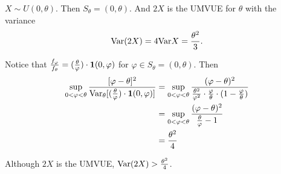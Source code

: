 \begin{exap}
	$X \sim U(0,\theta)$. Then $S_\theta = (0,\theta)$. And $2X$ is the UMVUE for $\theta$ with the variance
	$$\mathrm{Var} (2X) = 4 \mathrm{Var} X = \frac{\theta^2}{3}.$$
	 
	Notice that $\frac{f_\varphi}{f_\theta} = (\frac{\theta}{\varphi}) \cdot \boldsymbol{1}(0, \varphi)$ for $\varphi \in S_\theta = (0,\theta)$. Then
	\begin{align*}
		\sup_{0 < \varphi < \theta} \frac{ [\varphi - \theta]^2 }{ \mathrm{Var}_{\theta} [ (\frac{\theta}{\varphi}) \cdot \boldsymbol{1}(0, \varphi) ] } &= \sup_{0 < \varphi < \theta} \frac{ (\varphi - \theta)^2 }{ \frac{\theta^2}{\varphi^2} \cdot \frac{\varphi}{\theta} \cdot (1 - \frac{\varphi}{\theta}) } \\
		&= \sup_{0<\varphi < \theta } \frac{ (\varphi - \theta)^2 }{\frac{\theta}{\varphi} - 1} \\
		& = \frac{\theta^2}{4}
	\end{align*}
	
	Although $2X$ is the UMVUE, $\mathrm{Var}(2X) > \frac{\theta^2}{4}$.
\end{exap}

\begin{comment}
\begin{mydef}
	efficient, asymptotically efficient
\end{mydef}
\end{comment}

